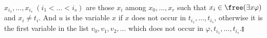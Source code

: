 \begin{enumerate}[1.]
\[\begin{array}{l}
\end{array}
\]
$x_{i_1} , \ldots , x_{i_s} \; (i_1 < \ldots < i_s)$ are those $x_i$ among $x_0 , \ldots , x_r$ such that $x_i \in \free (\exists x \varphi)$ and $x_i \neq t_i$. And $u$ is the variable $x$ if $x$ does not occur in $t_{i_1}, \ldots , t_{i_s}$, otherwise it is the first variable in the list $v_0 , v_1 , v_2 , \ldots$ which does not occur in $\varphi , t_{i_1} , \ldots , t_{i_s}$.\nolinebreak\hfill$\talloblong$
\end{enumerate}
